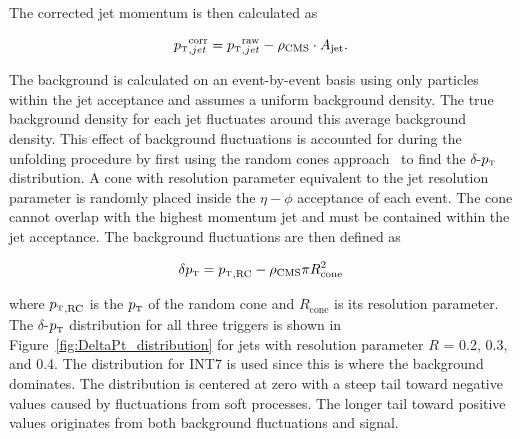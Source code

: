 \documentclass[ALICE]{ALICE_analysis_notes}
\newcommand{\pT}{$p_{\mbox{\tiny T}}$\xspace}
\begin{document}
The corrected jet momentum is then calculated as 

\begin{equation}
    \text{\pT}_{,jet}^{\text{corr}} = \text{\pT}_{,jet}^{\text{raw}} - \rho_{\text{CMS}} \cdot A_{\text{jet}}.
\end{equation}

\noindent
The background is calculated on an event-by-event basis using only particles within the jet acceptance and assumes a uniform background density. The true background density for each jet fluctuates around this average background density. This effect of background fluctuations is accounted for during the unfolding procedure by first using the random cones approach~\cite{ALICE:2012nbx} to find the $\delta$-\pT distribution. A cone with resolution parameter equivalent to the jet resolution parameter is randomly placed inside the $\eta-\phi$ acceptance of each event. The cone cannot overlap with the highest momentum jet and must be contained within the jet acceptance. The background fluctuations are then defined as 

\begin{equation}
    \delta \text{\pT} = \text{\pT}_\text{,RC} - \rho_{\text{CMS}} \pi R_{\text{cone}}^2
\end{equation}

\noindent
where $\text{\pT}_\text{,RC}$ is the \pT of the random cone and $R_{\text{cone}}$ is its resolution parameter. The $\delta$-\pT distribution for all three triggers is shown in Figure~\ref{fig:DeltaPt_distribution} for jets with resolution parameter $R$ = 0.2, 0.3, and 0.4. The distribution for INT7 is used since this is where the background dominates. The distribution is centered at zero with a steep tail toward negative values caused by fluctuations from soft processes. The longer tail toward positive values originates from both background fluctuations and signal.
\end{document}
